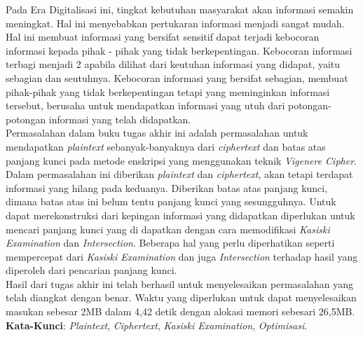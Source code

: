 \begin{abstrak}
		\indent Pada Era Digitalisasi ini, tingkat kebutuhan masyarakat akan informasi semakin meningkat. Hal ini menyebabkan pertukaran informasi menjadi sangat mudah. Hal ini membuat informasi yang bersifat sensitif dapat terjadi kebocoran informasi kepada pihak - pihak yang tidak berkepentingan. Kebocoran informasi terbagi menjadi 2 apabila dilihat dari keutuhan informasi yang didapat, yaitu sebagian dan seutuhnya. Kebocoran informasi yang bersifat sebagian, membuat pihak-pihak yang tidak berkepentingan tetapi yang meminginkan informasi tersebut, berusaha untuk mendapatkan informasi yang utuh dari potongan-potongan informasi yang telah didapatkan. 
\\
\indent Permasalahan dalam buku tugas akhir ini adalah permasalahan untuk mendapatkan \textit{plaintext} sebanyak-banyaknya dari \textit{ciphertext} dan batas atas panjang kunci pada metode enskripsi yang menggunakan teknik \textit{Vigenere Cipher}. Dalam permasalahan ini diberikan \textit{plaintext} dan \textit{ciphertext}, akan tetapi terdapat informasi yang hilang pada keduanya. Diberikan batas atas panjang kunci, dimana batas atas ini belum tentu panjang kunci yang sesungguhnya. Untuk dapat merekonstruksi \plaintext dari kepingan informasi yang didapatkan diperlukan untuk mencari panjang kunci yang di dapatkan dengan cara memodifikasi \textit{Kasiski Examination} dan \textit{Intersection}. Beberapa hal yang perlu diperhatikan seperti mempercepat dari \textit{Kasiski Examination} dan juga \textit{Intersection} terhadap hasil yang diperoleh dari pencarian panjang kunci.
\\  
\indent Hasil dari tugas akhir ini telah berhasil untuk menyelesaikan permasalahan yang telah diangkat dengan benar. Waktu yang diperlukan untuk dapat menyelesaikan masukan sebesar 2MB dalam 4,42 detik dengan alokasi memori sebesari 26,5MB.
\\
\noindent \textbf{Kata-Kunci}:  \textit{Plaintext}, \textit{Ciphertext}, \textit{Kasiski Examination},  \textit{Optimisasi}.
\end{abstrak}


